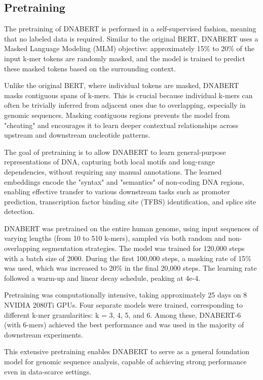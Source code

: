 \subsection{Pretraining}

The pretraining of DNABERT is performed in a self-supervised fashion, meaning that no labeled data is required. Similar to the original BERT, DNABERT uses a Masked Language Modeling (MLM) objective: approximately 15\% to 20\% of the input k-mer tokens are randomly masked, and the model is trained to predict these masked tokens based on the surrounding context.

Unlike the original BERT, where individual tokens are masked, DNABERT masks contiguous spans of k-mers. This is crucial because individual k-mers can often be trivially inferred from adjacent ones due to overlapping, especially in genomic sequences. Masking contiguous regions prevents the model from "cheating" and encourages it to learn deeper contextual relationships across upstream and downstream nucleotide patterns.

The goal of pretraining is to allow DNABERT to learn general-purpose representations of DNA, capturing both local motifs and long-range dependencies, without requiring any manual annotations. The learned embeddings encode the "syntax" and "semantics" of non-coding DNA regions, enabling effective transfer to various downstream tasks such as promoter prediction, transcription factor binding site (TFBS) identification, and splice site detection.

DNABERT was pretrained on the entire human genome, using input sequences of varying lengths (from 10 to 510 k-mers), sampled via both random and non-overlapping segmentation strategies. The model was trained for 120,000 steps with a batch size of 2000. During the first 100,000 steps, a masking rate of 15\% was used, which was increased to 20\% in the final 20,000 steps. The learning rate followed a warm-up and linear decay schedule, peaking at 4e-4. 

Pretraining was computationally intensive, taking approximately 25 days on 8 NVIDIA 2080Ti GPUs. Four separate models were trained, corresponding to different k-mer granularities: k = 3, 4, 5, and 6. Among these, DNABERT-6 (with 6-mers) achieved the best performance and was used in the majority of downstream experiments.

This extensive pretraining enables DNABERT to serve as a general foundation model for genomic sequence analysis, capable of achieving strong performance even in data-scarce settings.

